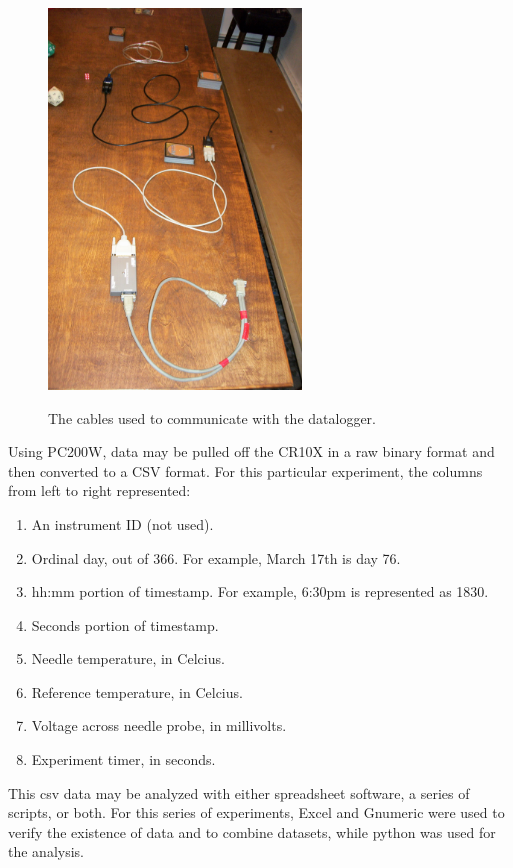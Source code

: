 \begin{figure}[h]
\centering
\includegraphics[width=0.6\textwidth]{fig/cable.jpg}
\label{fig:cable}
\caption{The cables used to communicate with the datalogger.}
\end{figure}

Using PC200W, data may be pulled off the CR10X in a raw binary format and then
converted to a CSV format. For this particular experiment, the columns from left
to right represented:

\begin{enumerate}
\item An instrument ID (not used).
\item Ordinal day, out of 366. For example, March 17th is day 76.
\item hh:mm portion of timestamp. For example, 6:30pm is represented as 1830.
\item Seconds portion of timestamp.
\item Needle temperature, in Celcius.
\item Reference temperature, in Celcius.
\item Voltage across needle probe, in millivolts.
\item Experiment timer, in seconds.
\end{enumerate}

This csv data may be analyzed with either spreadsheet software, a series of
scripts, or both. For this series of experiments, Excel and Gnumeric were used
to verify the existence of data and to combine datasets, while python was used
for the analysis.

